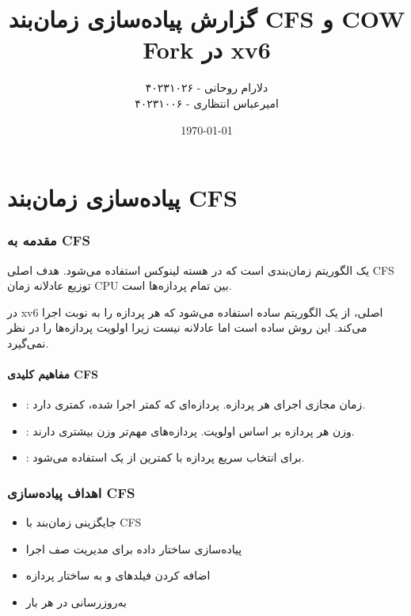 \documentclass[12pt,a4paper]{article}
\title{\textbf{گزارش پیاده‌سازی زمان‌بند CFS و COW Fork در xv6}}
\author{دلارام روحانی - ۴۰۲۳۱۰۲۶ \\
امیرعباس انتظاری - ۴۰۲۳۱۰۰۶}
\date{\today}
\begin{document}
\maketitle

\tableofcontents
\newpage


\part{پیاده‌سازی زمان‌بند CFS}

\section{مقدمه به CFS}
\textbf{} یک الگوریتم زمان‌بندی است که در هسته لینوکس استفاده می‌شود. هدف اصلی CFS توزیع عادلانه زمان CPU بین تمام پردازه‌ها است.

در xv6 اصلی، از یک الگوریتم ساده  استفاده می‌شود که هر پردازه را به نوبت اجرا می‌کند. این روش ساده است اما عادلانه نیست زیرا اولویت پردازه‌ها را در نظر نمی‌گیرد.

\subsection{مفاهیم کلیدی CFS}
\begin{itemize}
    \item \textbf{}: زمان مجازی اجرای هر پردازه. پردازه‌ای که کمتر اجرا شده،  کمتری دارد.
    \item \textbf{}: وزن هر پردازه بر اساس اولویت. پردازه‌های مهم‌تر وزن بیشتری دارند.
    \item \textbf{}: برای انتخاب سریع پردازه با کمترین  از یک  استفاده می‌شود.
\end{itemize}

\section{اهداف پیاده‌سازی CFS}
\begin{itemize}
    \item جایگزینی زمان‌بند  با CFS
    \item پیاده‌سازی ساختار داده  برای مدیریت صف اجرا
    \item اضافه کردن فیلدهای  و  به ساختار پردازه
    \item به‌روزرسانی  در هر بار 
\end{itemize}
\end{document}
